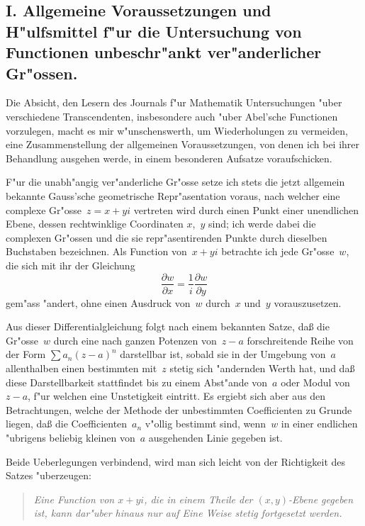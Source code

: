 \documentclass[12pt,a4paper]{book}
\theoremstyle{definition}
\theoremstyle{remark}
\begin{document}
\subsection*{I. Allgemeine Voraussetzungen und H"ulfsmittel f"ur die
Untersuchung von Functionen unbeschr"ankt ver"anderlicher Gr"ossen.}

Die Absicht, den Lesern des Journals f"ur Mathematik Untersuchungen
"uber verschiedene Transcendenten, insbesondere auch "uber Abel'sche
Functionen vorzulegen, macht es mir w"unschenswerth, um Wiederholungen
zu vermeiden, eine Zusammenstellung der allgemeinen Voraussetzungen,
von denen ich bei ihrer Behandlung ausgehen werde, in einem besonderen
Aufsatze voraufschicken.

F"ur die unabh"angig ver"anderliche Gr"osse setze ich stets die jetzt
allgemein bekannte Gauss'sche geometrische Repr"asentation voraus,
nach welcher eine complexe Gr"osse~$z = x + yi$ vertreten wird durch
einen Punkt einer unendlichen Ebene, dessen rechtwinklige Coordinaten
$x$,~$y$ sind; ich werde dabei die complexen Gr"ossen und die sie
repr"asentirenden Punkte durch dieselben Buchstaben bezeichnen. Als
Function von~$x + yi$ betrachte ich jede Gr"osse~$w$, die sich mit ihr
der Gleichung
\begin{equation}
\label{eq:diff}
\frac{\partial w}{\partial x} = \frac{1}{i}\frac{\partial w}{\partial y}
\end{equation}
gem"ass "andert, ohne einen Ausdruck von~$w$ durch~$x$ und~$y$
vorauszusetzen.

Aus dieser Differentialgleichung folgt nach einem bekannten Satze, da\ss{}
die Gr"osse~$w$ durch eine nach ganzen Potenzen von~$z - a$
forschreitende Reihe von der Form $\sum a_n(z-a)^n$ darstellbar ist,
sobald sie in der Umgebung von~$a$ allenthalben einen bestimmten
mit~$z$ stetig sich "andernden Werth hat, und da\ss{} diese Darstellbarkeit
stattfindet bis zu einem Abst"ande von~$a$ oder Modul von~$z - a$, f"ur
welchen eine Unstetigkeit eintritt. Es ergiebt sich aber aus den
Betrachtungen, welche der Methode der unbestimmten Coefficienten zu
Grunde liegen, da\ss{} die Coefficienten~$a_n$ v"ollig bestimmt sind, wenn~$w$
in einer endlichen "ubrigens beliebig kleinen von~$a$ ausgehenden Linie
gegeben ist.

Beide Ueberlegungen verbindend, wird man sich leicht von der Richtigkeit
des Satzes "uberzeugen:

\begin{quote}
\textit{Eine Function von $x + yi$, die in einem Theile der $(x,y)$-Ebene
gegeben ist, kann dar"uber hinaus nur auf \emph{Eine} Weise stetig
fortgesetzt werden.}
\end{quote}
\end{document}
